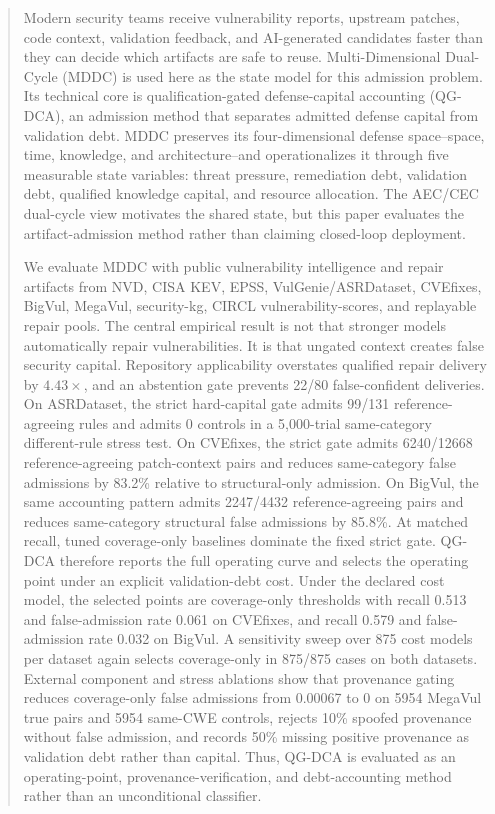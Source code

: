 ﻿\documentclass[lettersize,journal]{IEEEtran}
\begin{document}
\begin{abstract}
Modern security teams receive vulnerability reports, upstream patches, code context, validation feedback, and AI-generated candidates faster than they can decide which artifacts are safe to reuse. Multi-Dimensional Dual-Cycle (MDDC) is used here as the state model for this admission problem. Its technical core is qualification-gated defense-capital accounting (QG-DCA), an admission method that separates admitted defense capital from validation debt. MDDC preserves its four-dimensional defense space--space, time, knowledge, and architecture--and operationalizes it through five measurable state variables: threat pressure, remediation debt, validation debt, qualified knowledge capital, and resource allocation. The AEC/CEC dual-cycle view motivates the shared state, but this paper evaluates the artifact-admission method rather than claiming closed-loop deployment.

We evaluate MDDC with public vulnerability intelligence and repair artifacts from NVD, CISA KEV, EPSS, VulGenie/ASRDataset, CVEfixes, BigVul, MegaVul, security-kg, CIRCL vulnerability-scores, and replayable repair pools. The central empirical result is not that stronger models automatically repair vulnerabilities. It is that ungated context creates false security capital. Repository applicability overstates qualified repair delivery by $4.43\times$, and an abstention gate prevents 22/80 false-confident deliveries. On ASRDataset, the strict hard-capital gate admits 99/131 reference-agreeing rules and admits 0 controls in a 5,000-trial same-category different-rule stress test. On CVEfixes, the strict gate admits 6240/12668 reference-agreeing patch-context pairs and reduces same-category false admissions by 83.2\% relative to structural-only admission. On BigVul, the same accounting pattern admits 2247/4432 reference-agreeing pairs and reduces same-category structural false admissions by 85.8\%. At matched recall, tuned coverage-only baselines dominate the fixed strict gate. QG-DCA therefore reports the full operating curve and selects the operating point under an explicit validation-debt cost. Under the declared cost model, the selected points are coverage-only thresholds with recall 0.513 and false-admission rate 0.061 on CVEfixes, and recall 0.579 and false-admission rate 0.032 on BigVul. A sensitivity sweep over 875 cost models per dataset again selects coverage-only in 875/875 cases on both datasets. External component and stress ablations show that provenance gating reduces coverage-only false admissions from 0.00067 to 0 on 5954 MegaVul true pairs and 5954 same-CWE controls, rejects 10\% spoofed provenance without false admission, and records 50\% missing positive provenance as validation debt rather than capital. Thus, QG-DCA is evaluated as an operating-point, provenance-verification, and debt-accounting method rather than an unconditional classifier.


\end{abstract}
\end{document}
